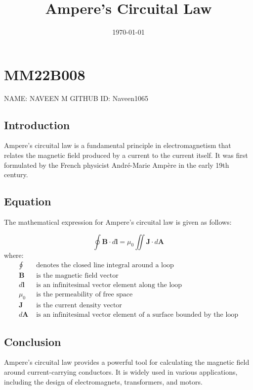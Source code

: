 \documentclass{article}
\begin{document}
\title{Ampere's Circuital Law}
\date{\today}

\maketitle
\section{MM22B008}
NAME: NAVEEN M
\newline
GITHUB ID: Naveen1065
\subsection{Introduction}
Ampere's circuital law is a fundamental principle in electromagnetism that relates the magnetic field produced by a current to the current itself. It was first formulated by the French physicist André-Marie Ampère in the early 19th century.

\subsection{Equation}
The mathematical expression for Ampere's circuital law is given as follows:

\begin{equation}
\oint \mathbf{B} \cdot d\mathbf{l} = \mu_0 \iint \mathbf{J} \cdot d\mathbf{A}
\end{equation}
where:
\begin{align*}
\oint & \text{ denotes the closed line integral around a loop}\\
\mathbf{B} & \text{ is the magnetic field vector}\\
d\mathbf{l} & \text{ is an infinitesimal vector element along the loop}\\
\mu_0 & \text{ is the permeability of free space}\\
\mathbf{J} & \text{ is the current density vector}\\
d\mathbf{A} & \text{ is an infinitesimal vector element of a surface bounded by the loop}
\end{align*}


\subsection{Conclusion}
Ampere's circuital law provides a powerful tool for calculating the magnetic field around current-carrying conductors. It is widely used in various applications, including the design of electromagnets, transformers, and motors.
\end{document}
